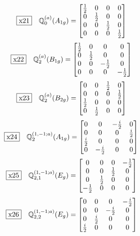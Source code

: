 \documentclass[fleqn,10pt,landscape]{jsarticle}
\begin{document}
\begin{dmath*}
\fbox{x21}\quad \mathbb{Q}_{0}^{(a)}(A_{1g})=\begin{bmatrix} \frac{1}{2} & 0 & 0 & 0 \\ 0 & \frac{1}{2} & 0 & 0 \\ 0 & 0 & \frac{1}{2} & 0 \\ 0 & 0 & 0 & \frac{1}{2} \end{bmatrix}
\end{dmath*}
\begin{dmath*}
\fbox{x22}\quad \mathbb{Q}_{2}^{(a)}(B_{1g})=\begin{bmatrix} \frac{1}{2} & 0 & 0 & 0 \\ 0 & \frac{1}{2} & 0 & 0 \\ 0 & 0 & - \frac{1}{2} & 0 \\ 0 & 0 & 0 & - \frac{1}{2} \end{bmatrix}
\end{dmath*}
\begin{dmath*}
\fbox{x23}\quad \mathbb{Q}_{2}^{(a)}(B_{2g})=\begin{bmatrix} 0 & 0 & \frac{1}{2} & 0 \\ 0 & 0 & 0 & \frac{1}{2} \\ \frac{1}{2} & 0 & 0 & 0 \\ 0 & \frac{1}{2} & 0 & 0 \end{bmatrix}
\end{dmath*}
\begin{dmath*}
\fbox{x24}\quad \mathbb{Q}_{2}^{(1,-1;a)}(A_{1g})=\begin{bmatrix} 0 & 0 & - \frac{i}{2} & 0 \\ 0 & 0 & 0 & \frac{i}{2} \\ \frac{i}{2} & 0 & 0 & 0 \\ 0 & - \frac{i}{2} & 0 & 0 \end{bmatrix}
\end{dmath*}
\begin{dmath*}
\fbox{x25}\quad \mathbb{Q}_{2,1}^{(1,-1;a)}(E_{g})=\begin{bmatrix} 0 & 0 & 0 & - \frac{1}{2} \\ 0 & 0 & \frac{1}{2} & 0 \\ 0 & \frac{1}{2} & 0 & 0 \\ - \frac{1}{2} & 0 & 0 & 0 \end{bmatrix}
\end{dmath*}
\begin{dmath*}
\fbox{x26}\quad \mathbb{Q}_{2,2}^{(1,-1;a)}(E_{g})=\begin{bmatrix} 0 & 0 & 0 & - \frac{i}{2} \\ 0 & 0 & - \frac{i}{2} & 0 \\ 0 & \frac{i}{2} & 0 & 0 \\ \frac{i}{2} & 0 & 0 & 0 \end{bmatrix}
\end{dmath*}
\end{document}
